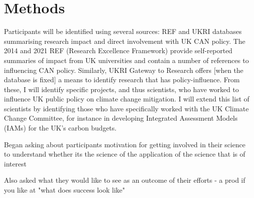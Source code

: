 \chapter{Methods}\label{ch:methods}

Participants will be identified using several sources: REF and UKRI databases summarising research impact and direct involvement with UK CAN policy. The 2014 and 2021 REF (Research Excellence Framework) provide self-reported summaries of impact from UK universities and contain a number of references to influencing CAN policy. Similarly, UKRI Gateway to Research offers [when the database is fixed] a means to identify research that has policy-influence. From these, I will identify specific projects, and thus scientists, who have worked to influence UK public policy on climate change mitigation. I will extend this list of scientists by identifying those who have specifically worked with the UK Climate Change Committee, for instance in developing Integrated Assessment Models (IAMs) for the UK’s carbon budgets.


Began asking about participants motivation for getting involved in their science to understand whether its the science of the application of the science that is of interest

Also asked what they would like to see as an outcome of their efforts - a prod if you like at "what does success look like"